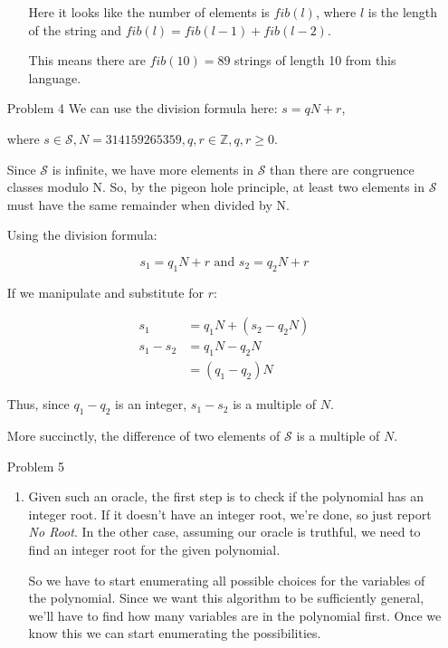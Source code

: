 \documentclass[12pt,letterpaper]{article}
\begin{document}
\begin{enumerate}
\begin{enumerate}
          Here it looks like the number of elements is $fib(l)$,
          where $l$ is the length of the string and $fib(l) = fib(l-1) + fib(l-2)$.

          This means there are $fib(10) = 89$ strings of length 10 from this language.

      \end{enumerate}

    \item[Problem 4]
      We can use the division formula here: $s = qN + r$,

      where $s \in \mathcal{S}, N = 314159265359, q, r \in \mathbb{Z}, q, r \ge 0$.

      Since $\mathcal{S}$ is infinite, we have more elements in $\mathcal{S}$ than there are congruence classes modulo N.
      So, by the pigeon hole principle, at least two elements in $\mathcal{S}$ must have the same remainder when divided by N.

      Using the division formula:

      \[s_1 = q_1N + r \text{ and } s_2 = q_2N + r\]

      If we manipulate and substitute for $r$:

      \begin{align*}
        s_1 &= q_1N + (s_2 - q_2N) \\
        s_1 - s_2 &= q_1N - q_2N \\
        &= (q_1 - q_2)N
      \end{align*}

      Thus, since $q_1 - q_2$ is an integer, $s_1 - s_2$ is a multiple of $N$.

      More succinctly, the difference of two elements of $\mathcal{S}$ is a multiple of $N$.

    \item[Problem 5]
      \begin{enumerate}
        \item
          Given such an oracle, the first step is to check if the polynomial has an integer root.
          If it doesn't have an integer root, we're done, so just report \textit{No Root}.
          In the other case, assuming our oracle is truthful, we need to find an integer root for the given polynomial.

          So we have to start enumerating all possible choices for the variables of the polynomial.
          Since we want this algorithm to be sufficiently general, we'll have to find how many variables are in the polynomial first.
          Once we know this we can start enumerating the possibilities.


\end{enumerate}
\end{enumerate}
\end{document}
